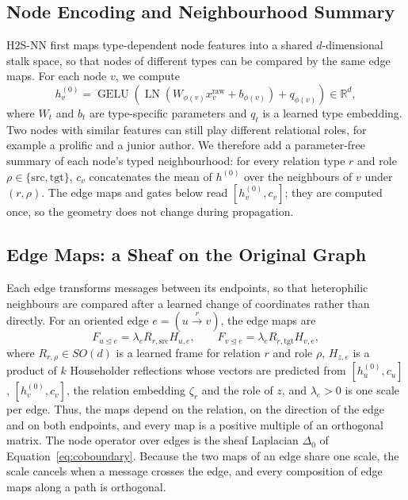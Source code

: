 \documentclass{article}
\newcommand{\R}{\mathbb{R}}
\newcommand{\method}{\textsc{H2S-NN}}
\newcommand{\inc}{\trianglelefteq}
\begin{document}
\subsection{Node Encoding and Neighbourhood Summary}
\method{} first maps type-dependent node features into a shared $d$-dimensional stalk space, so that nodes of different types can be compared by the same edge maps. For each node $v$, we compute
\begin{equation}
  h_v^{(0)}=\operatorname{GELU}\!\left(\operatorname{LN}\!\left(W_{\phi(v)}x_v^{\mathrm{raw}}+b_{\phi(v)}\right)+q_{\phi(v)}\right)\in\R^{d},
  \label{eq:encoder}
\end{equation}
where $W_t$ and $b_t$ are type-specific parameters and $q_t$ is a learned type embedding. Two nodes with similar features can still play different relational roles, for example a prolific and a junior author. We therefore add a parameter-free summary of each node's typed neighbourhood: for every relation type $r$ and role $\rho\in\{\mathrm{src},\mathrm{tgt}\}$, $c_v$ concatenates the mean of $h^{(0)}$ over the neighbours of $v$ under $(r,\rho)$. The edge maps and gates below read $[h_v^{(0)},c_v]$; they are computed once, so the geometry does not change during propagation.

\subsection{Edge Maps: a Sheaf on the Original Graph}
Each edge transforms messages between its endpoints, so that heterophilic neighbours are compared after a learned change of coordinates rather than directly. For an oriented edge $e=(u\xrightarrow{r}v)$, the edge maps are
\begin{equation}
  F_{u\inc e}=\lambda_e R_{r,\mathrm{src}}H_{u,e},\qquad
  F_{v\inc e}=\lambda_e R_{r,\mathrm{tgt}}H_{v,e},
  \label{eq:edge-maps}
\end{equation}
where $R_{r,\rho}\in SO(d)$ is a learned frame for relation $r$ and role $\rho$, $H_{z,e}$ is a product of $k$ Householder reflections whose vectors are predicted from $[h_u^{(0)},c_u]$, $[h_v^{(0)},c_v]$, the relation embedding $\zeta_r$ and the role of $z$, and $\lambda_e>0$ is one scale per edge. Thus, the maps depend on the relation, on the direction of the edge and on both endpoints, and every map is a positive multiple of an orthogonal matrix. The node operator over edges is the sheaf Laplacian $\Delta_0$ of Equation~\eqref{eq:coboundary}. Because the two maps of an edge share one scale, the scale cancels when a message crosses the edge, and every composition of edge maps along a path is orthogonal.
\end{document}
